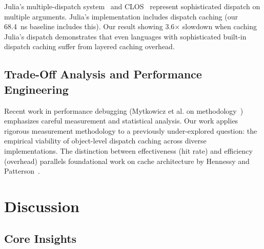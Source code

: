 \documentclass[sigplan,final,acmsmall,review,screen]{acmart}
\begin{document}
Julia's multiple-dispatch system~\cite{julia-lang} and CLOS~\cite{keene1989object} represent sophisticated dispatch on multiple arguments.
Julia's implementation includes dispatch caching (our 68.4~ns baseline includes this). Our result showing 3.6× slowdown when caching Julia's
dispatch demonstrates that even languages with sophisticated built-in dispatch caching suffer from layered caching overhead.

\subsection{Trade-Off Analysis and Performance Engineering}

Recent work in performance debugging (Mytkowicz et al. on methodology~\cite{mytkowicz2009producing}) emphasizes careful measurement
and statistical analysis. Our work applies rigorous measurement methodology to a previously under-explored question: the empirical
viability of object-level dispatch caching across diverse implementations. The distinction between effectiveness (hit rate) and efficiency (overhead)
parallels foundational work on cache architecture by Hennessy and Patterson~\cite{hennessy2011computer}.

\section{Discussion}
\label{sec:discussion}

\subsection{Core Insights}
\end{document}
